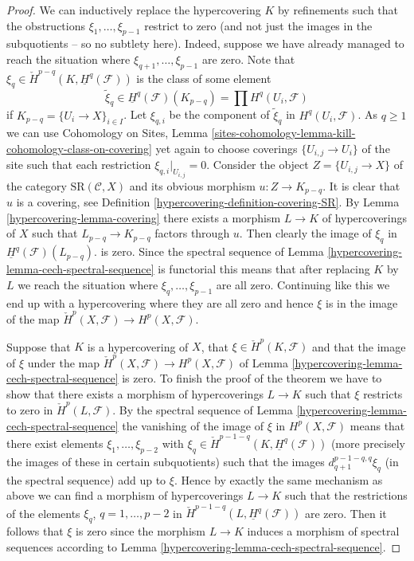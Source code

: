 \begin{proof}
\medskip\noindent
We can inductively replace the hypercovering $K$ by refinements
such that the obstructions $\xi_1, \ldots, \xi_{p - 1}$ restrict to zero
(and not just the images
in the subquotients -- so no subtlety here). Indeed, suppose we have
already managed to reach the situation where
$\xi_{q + 1}, \ldots, \xi_{p - 1}$ are zero.
Note that $\xi_q \in \check{H}^{p - q}(K, \underline{H}^q(\mathcal{F}))$
is the class of some element
$$
\tilde \xi_q \in
\underline{H}^q(\mathcal{F})(K_{p - q}) =
\prod H^q(U_i, \mathcal{F})
$$
if $K_{p - q} = \{U_i \to X\}_{i \in I}$. Let $\xi_{q, i}$
be the component of $\tilde \xi_q$ in $H^q(U_i, \mathcal{F})$.
As $q \geq 1$ we can use
Cohomology on Sites,
Lemma \ref{sites-cohomology-lemma-kill-cohomology-class-on-covering}
yet again to choose coverings $\{U_{i, j} \to U_i\}$
of the site such that each restriction $\xi_{q, i}|_{U_{i, j}} = 0$.
Consider the object $Z = \{U_{i, j} \to X\}$ of the category
$\text{SR}(\mathcal{C}, X)$ and its obvious morphism
$u : Z \to K_{p - q}$. It is clear that $u$ is a covering, see
Definition \ref{hypercovering-definition-covering-SR}. By
Lemma \ref{hypercovering-lemma-covering} there
exists a morphism $L \to K$ of hypercoverings of $X$ such that
$L_{p - q} \to K_{p - q}$ factors through $u$. Then clearly the
image of $\xi_q$ in $\underline{H}^q(\mathcal{F})(L_{p - q})$.
is zero. Since the spectral sequence of
Lemma \ref{hypercovering-lemma-cech-spectral-sequence}
is functorial this means that after replacing $K$ by $L$ we reach the
situation where $\xi_q, \ldots, \xi_{p - 1}$ are all zero.
Continuing like this we end up with a hypercovering where they are all
zero and hence $\xi$ is in the image of the map
$\check{H}^p(X, \mathcal{F}) \to H^p(X, \mathcal{F})$.

\medskip\noindent
Suppose that $K$ is a hypercovering of $X$, that
$\xi \in \check{H}^p(K, \mathcal{F})$ and that the image of
$\xi$ under the map
$\check{H}^p(X, \mathcal{F}) \to H^p(X, \mathcal{F})$ of
Lemma \ref{hypercovering-lemma-cech-spectral-sequence}
is zero. To finish the proof of the theorem we have to show that
there exists a morphism of hypercoverings $L \to K$ such that
$\xi$ restricts to zero in $\check{H}^p(L, \mathcal{F})$.
By the spectral sequence of Lemma \ref{hypercovering-lemma-cech-spectral-sequence}
the vanishing of the image of $\xi$ in $H^p(X, \mathcal{F})$
means that there exist elements $\xi_1, \ldots, \xi_{p - 2}$
with $\xi_q \in \check{H}^{p - 1 - q}(K, \underline{H}^q(\mathcal{F}))$
(more precisely the images of these in certain subquotients)
such that the images $d_{q + 1}^{p - 1 - q, q}\xi_q$ (in the spectral
sequence) add up to $\xi$. Hence by exactly the same mechanism as above
we can find a morphism of hypercoverings $L \to K$ such that
the restrictions of the elements $\xi_q$, $q = 1, \ldots, p - 2$
in $\check{H}^{p - 1 - q}(L, \underline{H}^q(\mathcal{F}))$ are zero.
Then it follows that $\xi$ is zero since the morphism $L \to K$
induces a morphism of spectral sequences according to
Lemma \ref{hypercovering-lemma-cech-spectral-sequence}.
\end{proof}

